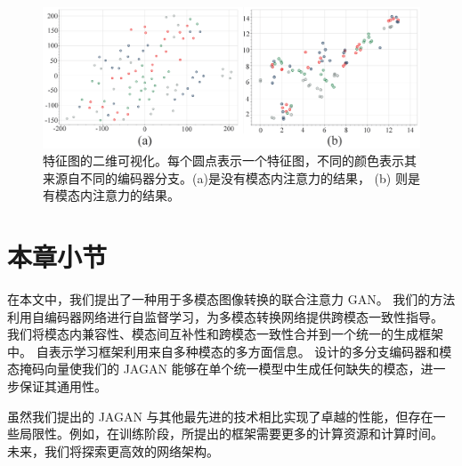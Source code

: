 \begin{figure}
    \includegraphics[width=1\columnwidth]{figures/JAGAN/regression.png}
	\caption{特征图的二维可视化。每个圆点表示一个特征图，不同的颜色表示其来源自不同的编码器分支。(a)是没有模态内注意力的结果， (b) 则是有模态内注意力的结果。}
	\label{fig:regression}
\end{figure}


\section{本章小节}

在本文中，我们提出了一种用于多模态图像转换的联合注意力 GAN。 我们的方法利用自编码器网络进行自监督学习，为多模态转换网络提供跨模态一致性指导。 我们将模态内兼容性、模态间互补性和跨模态一致性合并到一个统一的生成框架中。
自表示学习框架利用来自多种模态的多方面信息。 设计的多分支编码器和模态掩码向量使我们的 JAGAN 能够在单个统一模型中生成任何缺失的模态，进一步保证其通用性。

虽然我们提出的 JAGAN 与其他最先进的技术相比实现了卓越的性能，但存在一些局限性。例如，在训练阶段，所提出的框架需要更多的计算资源和计算时间。 未来，我们将探索更高效的网络架构。
